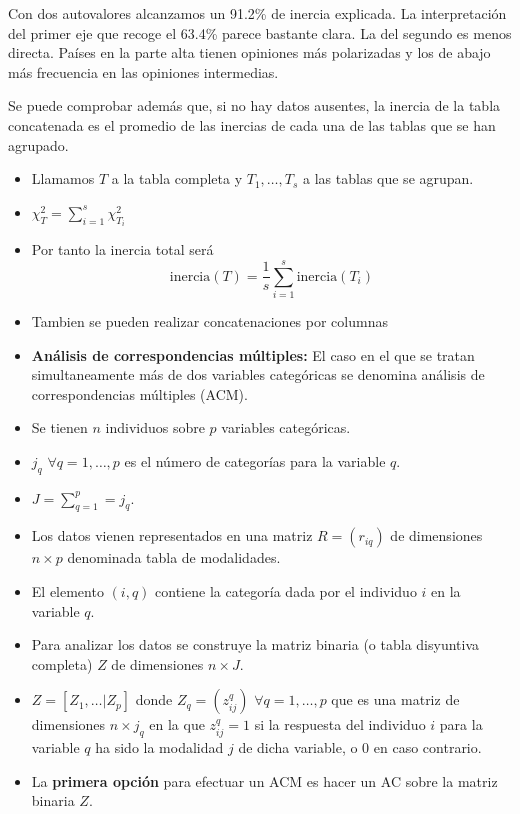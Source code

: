 \noindent Con dos autovalores alcanzamos un 91.2\% de inercia explicada. La interpretación del primer eje que recoge el 63.4\% parece bastante clara. La del segundo es menos directa. Países en la parte alta tienen opiniones más polarizadas y los de abajo más frecuencia en las opiniones intermedias. 

\vspace*{5mm}

\noindent Se puede comprobar además que, si no hay datos ausentes, la inercia de la tabla concatenada es el promedio de las inercias de cada una de las tablas que se han agrupado.

\clearpage

\begin{itemize}
    \item Llamamos $T$ a la tabla completa y $T_1,\dots,T_s$ a las tablas que se agrupan.
    \item $\chi^2_T=\sum_{i=1}^s\chi^2_{T_i}$
    \item Por tanto la inercia total será
    \[
        \text{inercia}(T)=\frac{1}{s}\sum_{i=1}^s\text{inercia}(T_i)
    \]
    \item Tambien se pueden realizar concatenaciones por columnas
    \item \textbf{Análisis de correspondencias múltiples:} El caso en el que se tratan simultaneamente más de dos variables categóricas se denomina análisis de correspondencias múltiples (ACM).
    \item Se tienen $n$ individuos sobre $p$ variables categóricas.
    \item $j_q$ $\forall q=1,\dots,p$ es el número de categorías para la variable $q$.
    \item $J=\sum_{q=1}^p=j_q$.
    \item Los datos vienen representados en una matriz $R=(r_{iq})$ de dimensiones $n\times p$ denominada tabla de modalidades.
    \item El elemento $(i,q)$ contiene la categoría dada por el individuo $i$ en la variable $q$.
    \item Para analizar los datos se construye la matriz binaria (o tabla disyuntiva completa) $Z$ de dimensiones $n\times J$.
    \item $Z=[Z_1,\dots|Z_p]$ donde $Z_q=(z^q_{ij})$ $\forall q=1,\dots,p$ que es una matriz de dimensiones $n\times j_q$ en la que $z^q_{ij}=1$ si la respuesta del individuo $i$ para la variable $q$ ha sido la modalidad $j$ de dicha variable, o 0 en caso contrario.
    \item La \textbf{primera opción} para efectuar un ACM es hacer un AC sobre la matriz binaria $Z$.

\end{itemize}
